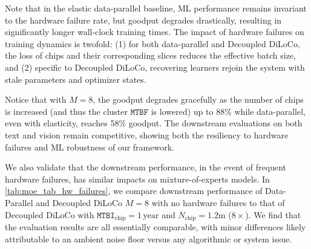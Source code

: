 \documentclass[11pt, a4paper, twocolumn, copyright, google]{google}
\begin{document}
Note that in the elastic data-parallel baseline, ML performance remains invariant to the hardware failure rate, but goodput degrades drastically, resulting in significantly longer wall-clock training times. The impact of hardware failures on training dynamics is twofold: (1) for both data-parallel and Decoupled DiLoCo, the loss of chips and their corresponding slices reduces the effective batch size, and (2) specific to Decoupled DiLoCo, recovering learners rejoin the system with stale parameters and optimizer states.

Notice that with $M=8$, the goodput degrades gracefully as the number of chips is increased (and thus the cluster $\texttt{MTBF}$ is lowered) up to 88\% while data-parallel, even with elasticity, reaches 58\% goodput. The downstream evaluations on both text and vision remain competitive, showing both the resiliency to hardware failures and ML robustness of our framework. 

We also validate that the downstream performance, in the event of frequent hardware failures, has similar impacts on mixture-of-experts models. In \autoref{tab:moe_tab_hw_failures}, we compare downstream performance of Data-Parallel and Decoupled DiLoCo $M=8$ with no hardware failures to that of Decoupled DiLoCo with $\texttt{MTBI}_{\text{chip}} = 1\, \text{year}$ and $N_\text{chip}=1.2\text{m}$ ($8\times$). We find that the evaluation results are all essentially comparable, with minor differences likely attributable to an ambient noise floor versus any algorithmic or system issue.

\FloatBarrier
\end{document}
